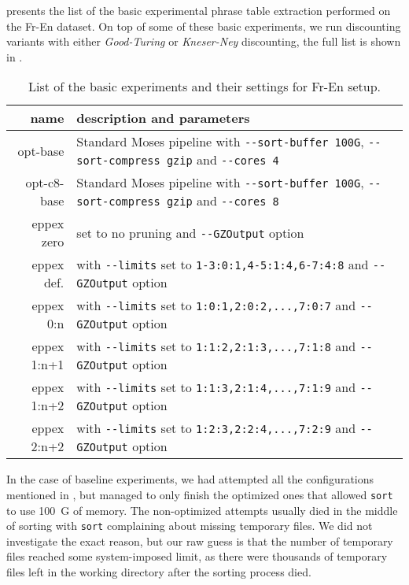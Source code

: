  presents the list of the basic experimental phrase table extraction
performed on the Fr-En dataset.
On top of some of these basic experiments, we run discounting variants with either
\emph{Good-Turing} or \emph{Kneser-Ney} discounting, the full list is shown in .

\begin{table}[ht]
\centering
\begin{tabular}{ r p{10cm} }
name & description and parameters \\
\hline
\hline
opt-base      & Standard Moses pipeline with \verb|--sort-buffer 100G|, \verb|--sort-compress gzip| and \verb|--cores 4| \\
opt-c8-base   & Standard Moses pipeline with \verb|--sort-buffer 100G|, \verb|--sort-compress gzip| and \verb|--cores 8| \\
eppex zero    & \eppex{} set to no pruning and \verb|--GZOutput| option \\
eppex def.    & \eppex{} with \verb|--limits| set to \verb|1-3:0:1,4-5:1:4,6-7:4:8| and \verb|--GZOutput| option \\
eppex 0:n     & \eppex{} with \verb|--limits| set to \verb|1:0:1,2:0:2,...,7:0:7| and \verb|--GZOutput| option \\
eppex 1:n+1   & \eppex{} with \verb|--limits| set to \verb|1:1:2,2:1:3,...,7:1:8| and \verb|--GZOutput| option \\
eppex 1:n+2   & \eppex{} with \verb|--limits| set to \verb|1:1:3,2:1:4,...,7:1:9| and \verb|--GZOutput| option \\
eppex 2:n+2   & \eppex{} with \verb|--limits| set to \verb|1:2:3,2:2:4,...,7:2:9| and \verb|--GZOutput| option \\
\hline
\hline
\end{tabular}
\caption{\label{fr-en-80-scenarios}
List of the basic experiments and their settings for Fr-En setup.}
\end{table}

In the case of baseline experiments, we had attempted all the configurations mentioned
in , but managed to only finish the optimized ones
that allowed \texttt{sort} to use 100~G of memory.
The non-optimized attempts usually died in the middle of sorting with \texttt{sort} complaining
about missing temporary files.
We did not investigate the exact reason, but our raw guess is that the number of temporary
files reached some system-imposed limit, as there were thousands of temporary files left in
the working directory after the sorting process died.

